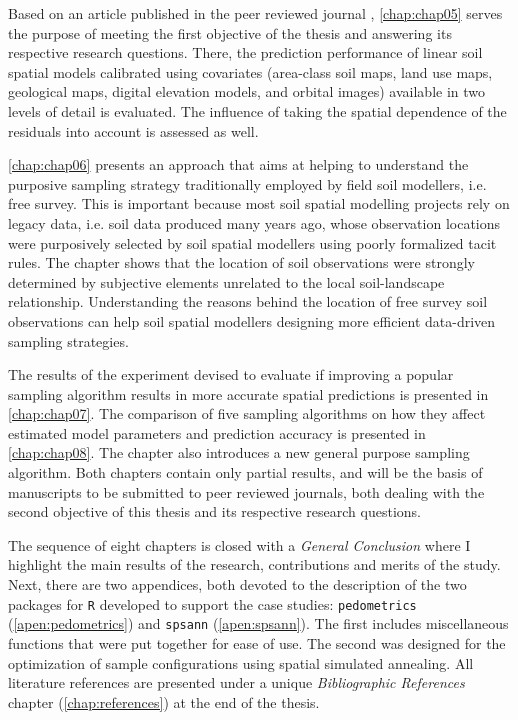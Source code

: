 Based on an article published in the peer reviewed journal \geoderma, \autoref{chap:chap05} serves the purpose 
of meeting the first objective of the thesis and answering its respective research questions. There, the 
prediction performance of linear soil spatial models calibrated using covariates (area-class soil maps, land 
use maps, geological maps, digital elevation models, and orbital images) available in two levels of detail is 
evaluated. The influence of taking the spatial dependence of the residuals into account is assessed as well. 

\autoref{chap:chap06} presents an approach that aims at helping to understand the purposive sampling strategy 
traditionally employed by field soil modellers, i.e. free survey. This is important because most soil 
spatial modelling projects rely on legacy data, i.e. soil data produced many years ago, whose observation 
locations were purposively selected by soil spatial modellers using poorly formalized tacit rules. The chapter 
shows that the location of soil observations were strongly determined by subjective elements unrelated to the 
local soil-landscape relationship. Understanding the reasons behind the location of free survey soil 
observations can help soil spatial modellers designing more efficient data-driven sampling strategies.

The results of the experiment devised to evaluate if improving a popular sampling algorithm results in more 
accurate spatial predictions is presented in \autoref{chap:chap07}. The comparison of five sampling algorithms 
on how they affect estimated model parameters and prediction accuracy is presented in \autoref{chap:chap08}. 
The chapter also introduces a new general purpose sampling algorithm. Both chapters contain only partial 
results, and will be the basis of manuscripts to be submitted to peer reviewed journals, both dealing with the 
second objective of this thesis and its respective research questions.

The sequence of eight chapters is closed with a \emph{General Conclusion} where I highlight the main results 
of the research, contributions and merits of the study. Next, there are two appendices, both devoted to the 
description of the two packages for \texttt{R} developed to support the case studies: \texttt{pedometrics} 
(\autoref{apen:pedometrics}) and \texttt{spsann} (\autoref{apen:spsann}). The first includes miscellaneous 
functions that were put together for ease of use. The second was designed for the optimization of sample 
configurations using spatial simulated annealing. All literature references are presented under a unique 
\emph{Bibliographic References} chapter (\autoref{chap:references}) at the end of the thesis.
